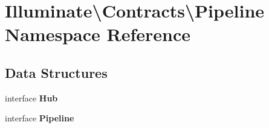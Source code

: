 \section{Illuminate\textbackslash{}Contracts\textbackslash{}Pipeline Namespace Reference}
\label{namespace_illuminate_1_1_contracts_1_1_pipeline}
\subsection*{Data Structures}
\begin{DoxyCompactItemize}
\item 
interface {\bf Hub}
\item 
interface {\bf Pipeline}
\end{DoxyCompactItemize}

